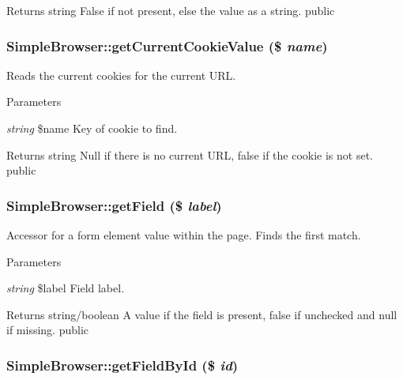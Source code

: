 \begin{DoxyReturn}{Returns}
string False if not present, else the value as a string.  public 
\end{DoxyReturn}
\hypertarget{class_simple_browser_a05080e0fe83a27c53d480bfaac80dd77}{
\subsubsection[{getCurrentCookieValue}]{\setlength{\rightskip}{0pt plus 5cm}SimpleBrowser::getCurrentCookieValue (\$ {\em name})}}
\label{class_simple_browser_a05080e0fe83a27c53d480bfaac80dd77}
Reads the current cookies for the current URL. 
\begin{DoxyParams}{Parameters}
\item[{\em string}]\$name Key of cookie to find. \end{DoxyParams}
\begin{DoxyReturn}{Returns}
string Null if there is no current URL, false if the cookie is not set.  public 
\end{DoxyReturn}
\hypertarget{class_simple_browser_a7ed630487541cc967a26b6491d44173c}{
\subsubsection[{getField}]{\setlength{\rightskip}{0pt plus 5cm}SimpleBrowser::getField (\$ {\em label})}}
\label{class_simple_browser_a7ed630487541cc967a26b6491d44173c}
Accessor for a form element value within the page. Finds the first match. 
\begin{DoxyParams}{Parameters}
\item[{\em string}]\$label Field label. \end{DoxyParams}
\begin{DoxyReturn}{Returns}
string/boolean A value if the field is present, false if unchecked and null if missing.  public 
\end{DoxyReturn}
\hypertarget{class_simple_browser_a77372832bd9b64449e958f3af30d4989}{
\subsubsection[{getFieldById}]{\setlength{\rightskip}{0pt plus 5cm}SimpleBrowser::getFieldById (\$ {\em id})}}
